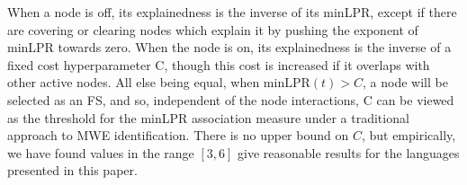\documentclass[11pt,letterpaper]{article}
\newcommand{\minLPR}{\ensuremath{\text{minLPR}}}
\begin{document}
When a node is off, its explainedness is the inverse of its minLPR, except if there are covering or clearing nodes which explain it by pushing the exponent of minLPR towards zero. When the node is on, its explainedness is the inverse of a fixed cost hyperparameter C, though this cost is increased if it overlaps with other active nodes. 
All else being equal, when $\minLPR(t) > C$, a node will be selected as an FS, and so, independent of the node interactions, C can be viewed as the threshold for the minLPR association measure under a traditional approach to MWE identification. There is no upper bound on $C$, but empirically, we have found values in the range $[3,6]$ give reasonable results for the languages presented in this paper.



\end{document}
